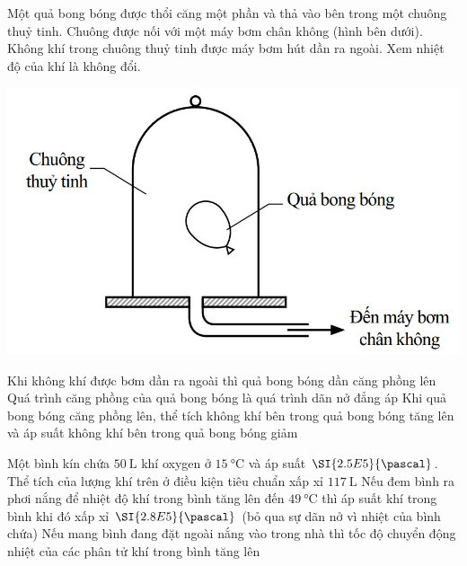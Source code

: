 \begin{ex}
	Một quả bong bóng được thổi căng một phần và thả vào bên trong một chuông thuỷ tinh. Chuông được nối với một máy bơm chân không (hình bên dưới). Không khí trong chuông thuỷ tinh được máy bơm hút dần ra ngoài. Xem nhiệt độ của khí là không đổi.
	\begin{center}
		\includegraphics[width=0.4\linewidth]{../figs/G12C2-6}
	\end{center}
	{\True Khi không khí được bơm dần ra ngoài thì quả bong bóng dần căng phồng lên}
	{Quá trình căng phồng của quả bong bóng là quá trình dãn nở đẳng áp}
	{\True Khi quả bong bóng căng phồng lên, thể tích không khí bên trong quả bong bóng tăng lên và áp suất không khí bên trong quả bong bóng giảm}
	\loigiai{}
\end{ex}
\begin{ex}
	Một bình kín chứa $\SI{50}{\liter}$ khí oxygen ở $\SI{15}{\celsius}$ và áp suất $\SI{2.5E5}{\pascal}$.
	{\True Thể tích của lượng khí trên ở điều kiện tiêu chuẩn xấp xỉ $\SI{117}{\liter}$}
	{\True Nếu đem bình ra phơi nắng để nhiệt độ khí trong bình tăng lên đến $\SI{49}{\celsius}$ thì áp suất khí trong bình khi đó xấp xỉ $\SI{2.8E5}{\pascal}$ (bỏ qua sự dãn nở vì nhiệt của bình chứa)}
	{Nếu mang bình đang đặt ngoài nắng vào trong nhà thì tốc độ chuyển động nhiệt của các phân tử khí trong bình tăng lên}
	\loigiai{}
\end{ex}
